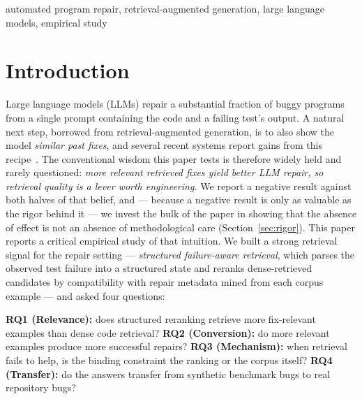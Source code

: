 \documentclass[10pt,conference]{IEEEtran}
\begin{document}
\begin{IEEEkeywords}
automated program repair, retrieval-augmented generation, large language
models, empirical study
\end{IEEEkeywords}

\section{Introduction}
\label{sec:intro}

Large language models (LLMs) repair a substantial fraction of buggy programs
from a single prompt containing the code and a failing test's output. A
natural next step, borrowed from retrieval-augmented generation, is to also
show the model \emph{similar past fixes}, and several recent systems report
gains from this recipe~\cite{recode,inferfix,rapgen,ragfix}. The
conventional wisdom this paper tests is therefore widely held and rarely
questioned: \emph{more relevant retrieved fixes yield better LLM repair, so
retrieval quality is a lever worth engineering.} We report a negative
result against both halves of that belief, and --- because a negative result
is only as valuable as the rigor behind it --- we invest the bulk of the
paper in showing that the absence of effect is not an absence of
methodological care (Section~\ref{sec:rigor}). This paper
reports a critical empirical study of that intuition. We built a strong
retrieval signal for the repair setting --- \emph{structured failure-aware
retrieval}, which parses the observed test failure into a structured state
and reranks dense-retrieved candidates by compatibility with repair metadata
mined from each corpus example --- and asked four questions:

\textbf{RQ1 (Relevance):} does structured reranking retrieve more
fix-relevant examples than dense code retrieval?
\textbf{RQ2 (Conversion):} do more relevant examples produce more successful
repairs?
\textbf{RQ3 (Mechanism):} when retrieval fails to help, is the binding
constraint the ranking or the corpus itself?
\textbf{RQ4 (Transfer):} do the answers transfer from synthetic benchmark
bugs to real repository bugs?
\end{document}
